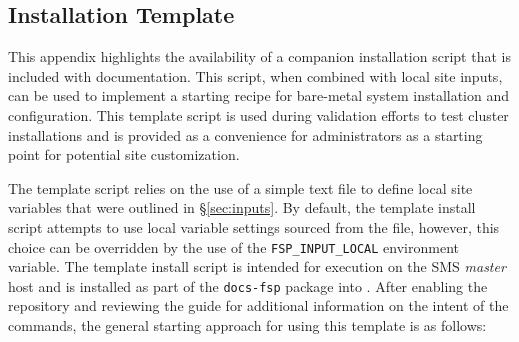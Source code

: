 \subsection{Installation Template}  \label{appendix:template_script}

This appendix highlights the availability of a companion installation script
that is included with \FSP{} documentation.  This script, when combined with
local site inputs, can be used to implement a starting recipe for
bare-metal system installation and configuration. This template script is used
during validation efforts to test cluster installations and is provided as a
convenience for administrators as a starting point for potential site
customization. 

The template script relies on the use of a simple text file to
define local site variables that were outlined in \S\ref{sec:inputs}.
By default, the template install script attempts to use local variable settings
sourced from the  file,
however, this choice can be overridden by the use of the
\texttt{FSP\_INPUT\_LOCAL} environment variable. The template install script is
intended for execution on the SMS {\em master} host and is installed as part of
the \texttt{docs-fsp} package into .
After enabling the \FSP{} repository and reviewing the guide for additional information on the intent of the
commands, the general starting approach for using this template is as follows:

